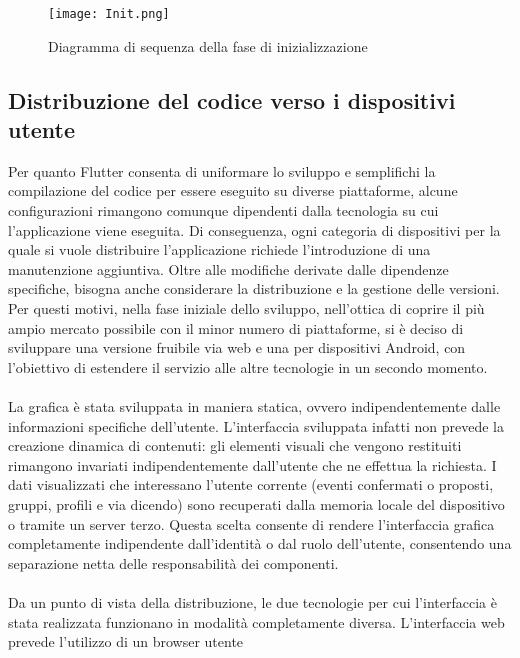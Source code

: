 \begin{figure}[h!]
    \begin{center}
        \texttt{[image: Init.png]}
        \caption{Diagramma di sequenza della fase di inizializzazione }
    \end{center}
\end{figure}


\clearpage

\subsection{Distribuzione del codice verso i dispositivi utente}

Per quanto Flutter consenta di uniformare lo sviluppo e
semplifichi la compilazione del codice per essere eseguito su diverse piattaforme,
alcune configurazioni rimangono comunque dipendenti
dalla tecnologia su cui l'applicazione viene eseguita.
Di conseguenza,
ogni categoria di dispositivi per la quale si vuole distribuire l'applicazione
richiede l'introduzione di una manutenzione aggiuntiva.
Oltre alle modifiche derivate dalle dipendenze specifiche,
bisogna anche considerare la distribuzione e la gestione delle versioni.
Per questi motivi, nella fase iniziale dello sviluppo,
nell'ottica di coprire il più ampio mercato possibile con il minor numero di piattaforme,
si è deciso di sviluppare una versione fruibile via web e una per dispositivi Android,
con l'obiettivo di estendere il servizio alle altre tecnologie in un secondo momento.\\
\\
La grafica è stata sviluppata in maniera statica,
ovvero indipendentemente dalle informazioni specifiche dell'utente.
L'interfaccia sviluppata infatti non prevede la creazione dinamica di contenuti:
gli elementi visuali che vengono restituiti rimangono invariati
indipendentemente dall'utente che ne effettua la richiesta.
I dati visualizzati che interessano l'utente corrente
(eventi confermati o proposti, gruppi, profili e via dicendo)
sono recuperati dalla memoria locale del dispositivo o tramite un server terzo.
Questa scelta consente di rendere l'interfaccia grafica completamente
indipendente dall'identità o dal ruolo dell'utente,
consentendo una separazione netta delle responsabilità dei componenti.\\
\\
Da un punto di vista della distribuzione,
le due tecnologie per cui l'interfaccia è stata realizzata
funzionano in modalità completamente diversa.
L'interfaccia web prevede l'utilizzo di un browser utente

